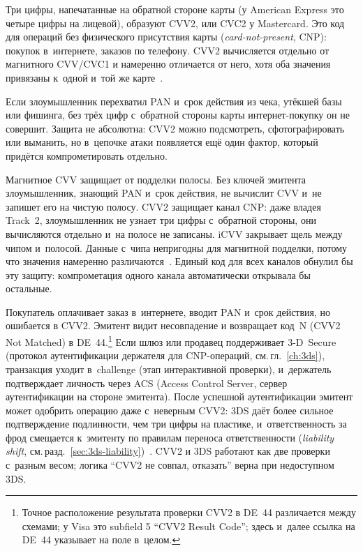 Три цифры, напечатанные на обратной стороне карты (у American
Express это четыре цифры на лицевой), образуют CVV2, или CVC2
у Mastercard. Это код для операций без физического присутствия
карты (\textit{card-not-present}, CNP): покупок в~интернете, заказов
по телефону. CVV2 вычисляется отдельно от магнитного CVV/CVC1
и намеренно отличается от него, хотя оба значения привязаны
к~одной и~той же карте~\cite{mc-security-rules-2016}.

Если злоумышленник перехватил PAN и~срок действия из чека, утёкшей
базы или фишинга, без трёх цифр с~обратной стороны карты
интернет-покупку он не совершит. Защита не абсолютна: CVV2 можно
подсмотреть, сфотографировать или выманить, но в~цепочке атаки
появляется ещё один фактор, который придётся компрометировать
отдельно.

Магнитное CVV защищает от подделки полосы. Без ключей эмитента
злоумышленник, знающий PAN и~срок действия, не вычислит CVV и~не
запишет его на чистую полосу. CVV2 защищает канал CNP: даже владея
Track~2, злоумышленник не узнает три цифры с~обратной стороны,
они вычисляются отдельно и~на полосе не записаны. iCVV закрывает
щель между чипом и~полосой. Данные с~чипа непригодны для магнитной
подделки, потому что значения намеренно различаются~\cite{visa-vsdc-guide,mc-security-rules-2016}.
Единый код для всех каналов обнулил бы эту защиту: компрометация
одного канала автоматически открывала бы остальные.

Покупатель оплачивает заказ в~интернете, вводит PAN и~срок действия,
но ошибается в CVV2. Эмитент видит несовпадение и возвращает
код~N (CVV2 Not Matched) в DE~44.\footnote{Точное расположение
результата проверки CVV2 в DE~44 различается между схемами;
у Visa это subfield 5 \enquote{CVV2 Result Code};
здесь и~далее ссылка на DE~44 указывает на поле в~целом.}
Если шлюз или продавец поддерживает 3-D~Secure (протокол
аутентификации держателя для CNP-операций, см.\,гл.~\ref{ch:3ds}),
транзакция уходит в~challenge (этап интерактивной проверки), и~держатель
подтверждает личность через ACS (Access Control Server, сервер
аутентификации на стороне эмитента).
После успешной аутентификации эмитент может одобрить операцию
даже с~неверным CVV2: 3DS даёт более сильное подтверждение подлинности,
чем три цифры на пластике, и~ответственность за фрод смещается
к~эмитенту по правилам переноса ответственности
(\textit{liability shift}, см.\,разд.~\ref{sec:3ds-liability})~\cite{visa-core-rules}.
CVV2 и 3DS работают как две проверки с~разным весом; логика
\enquote{CVV2 не совпал, отказать} верна при недоступном 3DS.

